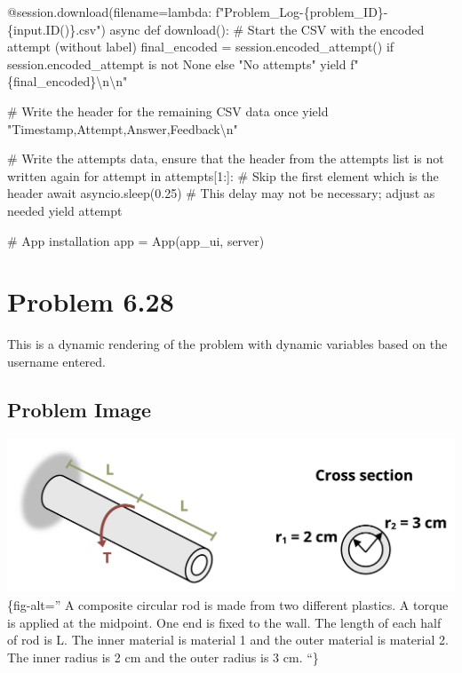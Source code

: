 \documentclass[
  letterpaper,
  DIV=11,
  numbers=noendperiod]{scrreprt}
\newenvironment{Shaded}{\begin{snugshade}}{\end{snugshade}}
\newcommand{\NormalTok}[1]{\textcolor[rgb]{0.00,0.23,0.31}{#1}}
\begin{document}
\begin{Shaded}
\begin{Highlighting}[]
\NormalTok{    @session.download(filename=lambda: f"Problem\_Log{-}\{problem\_ID\}{-}\{input.ID()\}.csv")}
\NormalTok{    async def download():}
\NormalTok{        \# Start the CSV with the encoded attempt (without label)}
\NormalTok{        final\_encoded = session.encoded\_attempt() if session.encoded\_attempt is not None else "No attempts"}
\NormalTok{        yield f"\{final\_encoded\}\textbackslash{}n\textbackslash{}n"}
        
\NormalTok{        \# Write the header for the remaining CSV data once}
\NormalTok{        yield "Timestamp,Attempt,Answer,Feedback\textbackslash{}n"}
        
\NormalTok{        \# Write the attempts data, ensure that the header from the attempts list is not written again}
\NormalTok{        for attempt in attempts[1:]:  \# Skip the first element which is the header}
\NormalTok{            await asyncio.sleep(0.25)  \# This delay may not be necessary; adjust as needed}
\NormalTok{            yield attempt}


\NormalTok{\# App installation}
\NormalTok{app = App(app\_ui, server)}
\end{Highlighting}
\end{Shaded}

\chapter*{Problem 6.28}\label{problem-6.28}


This is a dynamic rendering of the problem with dynamic variables based
on the username entered.

\section*{Problem Image}\label{problem-image-50}


\includegraphics{images/288.png}\{fig-alt='' A composite circular rod is
made from two different plastics. A torque is applied at the midpoint.
One end is fixed to the wall. The length of each half of rod is L. The
inner material is material 1 and the outer material is material 2. The
inner radius is 2 cm and the outer radius is 3 cm. ``\}
\end{document}
